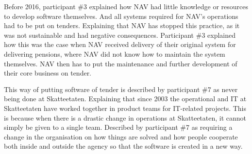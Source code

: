 
Before 2016, participant \#3 explained how NAV had little knowledge or resources to develop software themselves. And all systems required for NAV's operations had to be put on tenders. Explaining that NAV has stopped this practice, as it was not sustainable and had negative consequences. Participant \#3 explained how this was the case when NAV received delivery of their original system for delivering pensions, where NAV did not know how to maintain the system themselves. NAV then has to put the maintenance and further development of their core business on tender.


This way of putting software of tender is described by participant \#7 as never being done at Skatteetaten. Explaining that since 2003 the operational and IT at Skatteetaten have worked together in product teams for IT-related projects. This is because when there is a drastic change in operations at Skatteetaten, it cannot simply be given to a single team. Described by participant \#7 as requiring a change in the organisation on how things are solved and how people cooperate both inside and outside the agency so that the software is created in a new way.

